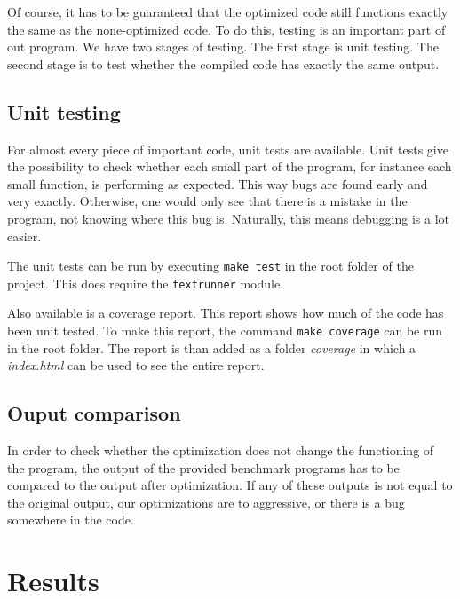 \documentclass[10pt,a4paper]{article}
\begin{document}
Of course, it has to be guaranteed that the optimized code still functions
exactly the same as the none-optimized code. To do this, testing is an
important part of out program. We have two stages of testing. The first stage
is unit testing. The second stage is to test whether the compiled code has
exactly the same output.

\subsection{Unit testing}

For almost every piece of important code, unit tests are available. Unit tests
give the possibility to check whether each small part of the program, for
instance each small function, is performing as expected. This way bugs are
found early and very exactly. Otherwise, one would only see that there is a
mistake in the program, not knowing where this bug is. Naturally, this means
debugging is a lot easier.

The unit tests can be run by executing \texttt{make test} in the root folder of
the project. This does require the \texttt{textrunner} module.

Also available is a coverage report. This report shows how much of the code has
been unit tested. To make this report, the command \texttt{make coverage} can
be run in the root folder. The report is than added as a folder \emph{coverage}
in which a \emph{index.html} can be used to see the entire report.

\subsection{Ouput comparison}

In order to check whether the optimization does not change the functioning of
the program, the output of the provided benchmark programs has to be compared
to the output after optimization. If any of these outputs is not equal to the
original output, our optimizations are to aggressive, or there is a bug
somewhere in the code.

\section{Results}
\end{document}

